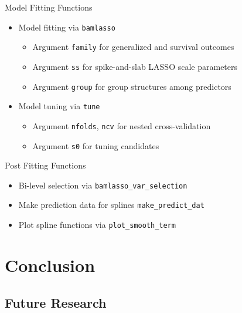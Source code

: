 \documentclass[
  ignorenonframetext,
  aspectratio=169]{beamer}
\providecommand{\tightlist}{%
  \setlength{\itemsep}{0pt}\setlength{\parskip}{0pt}}
\begin{document}
\begin{frame}[fragile]{Model Fitting Functions}
\protect\hypertarget{model-fitting-functions}{}
\begin{itemize}
\tightlist
\item
  Model fitting via \texttt{bamlasso}

  \begin{itemize}
  \tightlist
  \item
    Argument \texttt{family} for generalized and survival outcomes
  \item
    Argument \texttt{ss} for spike-and-slab LASSO scale parameters
  \item
    Argument \texttt{group} for group structures among predictors
  \end{itemize}
\item
  Model tuning via \texttt{tune}

  \begin{itemize}
  \tightlist
  \item
    Argument \texttt{nfolds}, \texttt{ncv} for nested cross-validation
  \item
    Argument \texttt{s0} for tuning candidates
  \end{itemize}
\end{itemize}
\end{frame}

\begin{frame}[fragile]{Post Fitting Functions}
\protect\hypertarget{post-fitting-functions}{}
\begin{itemize}
\tightlist
\item
  Bi-level selection via \texttt{bamlasso\_var\_selection}
\item
  Make prediction data for splines \texttt{make\_predict\_dat}
\item
  Plot spline functions via \texttt{plot\_smooth\_term}
\end{itemize}
\end{frame}

\hypertarget{conclusion}{%
\section{Conclusion}\label{conclusion}}

\hypertarget{future-research}{%
\subsection{Future Research}\label{future-research}}
\end{document}
